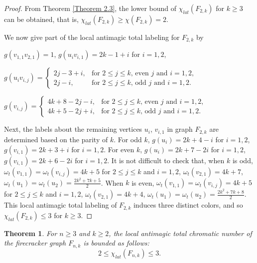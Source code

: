\documentclass[12pt]{article}
\newtheorem{theorem}{Theorem}[section]
\begin{document}
\begin{proof}
From Theorem \ref{Theorem 2.3}, the lower bound of $\chi_{lat}(F_{2,k})$ for $k\geq 3$ can be obtained,
that is, $\chi_{lat}(F_{2,k})\geq\chi(F_{2,k})=2$.

We now give part of the local antimagic total labeling for $F_{2,k}$ by

$g(v_{1,1}v_{2,1})=1$,  \hspace{1em}$ g(u_{i}v_{i,1})=2k-1+i$ for $i=1,2$,\vspace{0.4em}

$ g(u_{i}v_{i,j})=\begin{cases}
     2j-3+i, & \text{for $2\leq j\leq k$, even $j$ and $i=1,2$}, \\
     2j-i, & \text{for $2\leq j\leq k$, odd $j$ and $i=1,2$}. \end{cases}$\vspace{0.4em}

$g(v_{i,j})=\begin{cases}
     4k+8-2j-i, & \text{for $2\leq j\leq k$, even $j$ and $i=1,2$}, \\
     4k+5-2j+i, & \text{for $2\leq j\leq k$, odd $j$ and $i=1,2$}. \end{cases}$\vspace{0.6em}

\noindent Next, the labels about the remaining vertices $u_{i}$, $v_{i,1}$ in graph $F_{2,k}$ are determined based on the parity of $k$. For odd $k$, $g(u_{i})=2k+4-i$ for $i=1,2$, $g(v_{i,1})=2k+3+i$ for $i=1,2$. For even $k$, $g(u_{i})=2k+7-2i$ for $i=1,2$, $g(v_{i,1})=2k+6-2i$ for $i=1,2$. It is not difficult to check that, when $k$ is odd, $\omega_{t}(v_{1,1})=\omega_{t}(v_{i,j})=4k+5$ for $2\leq j\leq k$ and $i=1,2$, $\omega_{t}(v_{2,1})=4k+7$, $\omega_{t}(u_{1})=\omega_{t}(u_{2})=\frac{2k^{2}+7k+5}{2}$. When $k$ is even,  $\omega_{t}(v_{1,1})=\omega_{t}(v_{i,j})=4k+5$ for $2\leq j\leq k$ and $i=1,2$, $\omega_{t}(v_{2,1})=4k+4$, $\omega_{t}(u_{1})=\omega_{t}(u_{2})=\frac{2k^{2}+7k+8}{2}$. This local antimagic total labeling of $F_{2,k}$ induces three distinct colors, and so $\chi_{lat}(F_{2,k})\leq 3$ for $k\geq 3$.\end{proof}

\begin{theorem}
  For $n\geq 3$ and $k\geq 2$, the local antimagic total chromatic number of the firecracker graph $F_{n,k}$ is bounded as follows:
\begin{equation*}
  2\leq \chi_{lat}(F_{n,k})\leq 3.
\end{equation*}
\end{theorem}
\end{document}
